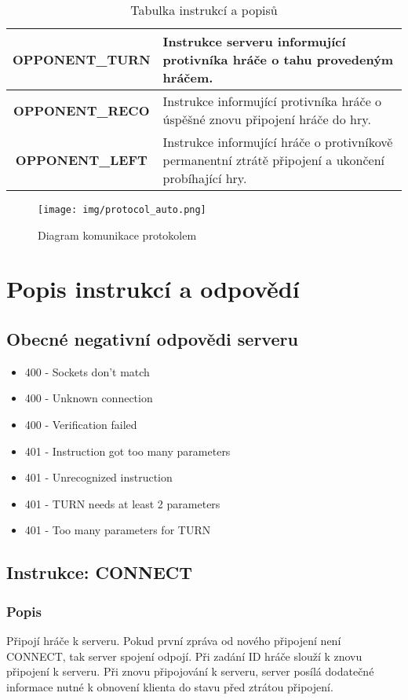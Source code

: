 \documentclass[12pt]{report}
\begin{document}
\begin{table}[H]
\begin{tabularx}{\textwidth}{|c|X|}
\textbf{OPPONENT\_TURN} & Instrukce serveru informující protivníka hráče o tahu provedeným hráčem.                                                                                 \\ \hline
\textbf{OPPONENT\_RECO} & Instrukce informující protivníka hráče o úspěšné znovu připojení hráče do hry.                                                                          \\ \hline
\textbf{OPPONENT\_LEFT} & Instrukce informující hráče o protivníkově permanentní ztrátě připojení a ukončení probíhající hry.                                                     \\ \hline
\end{tabularx}
	\caption{Tabulka instrukcí a popisů}
	\label{tab:instruction_tab}
\end{table}

\begin{figure}[H]
	\centering
	\texttt{[image: img/protocol\_auto.png]}
	\caption{Diagram komunikace protokolem}
	\label{img:protocol_auto}
\end{figure}

\section{Popis instrukcí a odpovědí}
%
\subsection{Obecné negativní odpovědi serveru}
\begin{itemize}
	\item 400 - Sockets don't match
	\item 400 - Unknown connection
	\item 400 - Verification failed
	\item 401 - Instruction got too many parameters
	\item 401 - Unrecognized instruction
	\item 401 - TURN needs at least 2 parameters
	\item 401 - Too many parameters for TURN
\end{itemize}
%
\subsection{Instrukce: CONNECT}
\subsubsection{Popis}
Připojí hráče k serveru. Pokud první zpráva od nového připojení není CONNECT,
tak server spojení odpojí. Při zadání ID hráče slouží k znovu připojení k serveru.
Při znovu připojování k serveru, server posílá dodatečné informace nutné k obnovení
klienta do stavu před ztrátou připojení.
\end{document}
